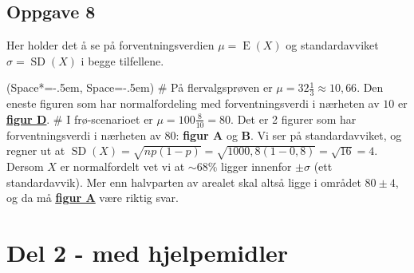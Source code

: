 \documentclass[12pt, a4paper]
{article}						%
\def\answer#1{\underline{\underline{#1}}}
\begin{document}
	
	\subsection*{Oppgave 8}
	Her holder det å se på forventningsverdien $\mu = \operatorname{E}(X)$ og standardavviket $\sigma = \operatorname{SD}(X)$ i begge tilfellene.
	\begin{easylist}[itemize]
		\ListProperties(Space*=-.5em, Space=-.5em)
		# På flervalgsprøven er $\mu = 32 \frac{1}{3} \approx 10,66$. Den eneste figuren som har normalfordeling med forventningsverdi i nærheten av $10$ er \answer{\textbf{figur D}}.
		# I frø-scenarioet er $\mu = 100 \frac{8}{10} = 80$. Det er 2 figurer som har forventningsverdi i nærheten av $80$: \textbf{figur A} og \textbf{B}. Vi ser på standardavviket, og regner ut at  $\operatorname{SD}(X) = \sqrt{n p (1- p)} = \sqrt{100 0,8 (1- 0,8)} = \sqrt{16} = 4$. Dersom $X$ er normalfordelt vet vi at $\sim 68 \%$ ligger innenfor $\pm \sigma$ (ett standardavvik). Mer enn halvparten av arealet skal altså ligge i området $80 \pm 4$, og da må \answer{\textbf{figur A}} være riktig svar.
	\end{easylist}
	
	
	
	
	\section*{Del 2 - med hjelpemidler}
\end{document}
